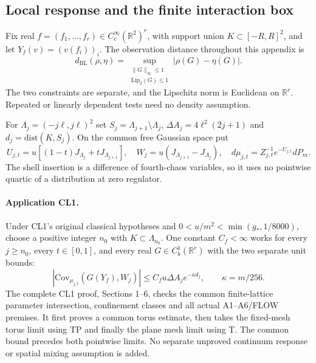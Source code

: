\documentclass[11pt]{article}
\theoremstyle{plain}
\theoremstyle{definition}
\theoremstyle{remark}
\newcommand{\R}{\mathbb{R}}
\newcommand{\dist}{\mathrm{dist}}
\begin{document}
\subsection{Local response and the finite interaction box}
\label{qrs:locality}

Fix real $f=(f_1,\ldots,f_r)\in C_c^\infty(\R^2)^r$, with support union
$K\subset[-R,R]^2$, and let $Y_f(v)=(v(f_i))_i$. The observation distance
throughout this appendix is
\begin{equation}\label{qrs:BL}
 d_{\mathrm{BL}}(\rho,\eta)
 =\sup_{\substack{\|G\|_\infty\le1\\ \mathrm{Lip}_{2}(G)\le1}}
     |\rho(G)-\eta(G)|.
\end{equation}
The two constraints are separate, and the Lipschitz norm is Euclidean on
$\R^r$. Repeated or linearly dependent tests need no density assumption.

For $\Lambda_j=(-j\ell,j\ell)^2$ set $S_j=\Lambda_{j+1}\setminus\Lambda_j$,
$\Delta A_j=4\ell^2(2j+1)$ and $d_j=\dist(K,S_j)$. On the common free
Gaussian space put
\begin{equation}\label{qrs:shell}
 U_{j,t}=u[(1-t)J_{\Lambda_j}+tJ_{\Lambda_{j+1}}],\quad
 W_j=u(J_{\Lambda_{j+1}}-J_{\Lambda_j}),\quad
 d\mu_{j,t}=Z_{j,t}^{-1}e^{-U_{j,t}}dP_m.
\end{equation}
The shell insertion is a difference of fourth-chaos variables, so it uses
no pointwise quartic of a distribution at zero regulator.

\paragraph{Application CL1.}
Under CL1's original classical hypotheses and
$0<u/m^2<\min(g_*,1/8000)$, choose a positive integer $n_0$ with
$K\subset\Lambda_{n_0}$. One constant $C_f<\infty$ works for every
$j\ge n_0$, every $t\in[0,1]$, and every real $G\in C_b^1(\R^r)$ with
the two separate unit bounds:
\begin{equation}\label{qrs:CL1}
 |\mathrm{Cov}_{\mu_{j,t}}(G(Y_f),W_j)|
 \le C_f u\Delta A_j e^{-\kappa d_j},\qquad \kappa=m/256.
\end{equation}
The complete CL1 proof, Sections 1--6, checks the common finite-lattice
parameter intersection, confinement classes and all actual A1--A6/FLOW
premises. It first proves a common torus estimate, then takes the
fixed-mesh torus limit using TP and finally the plane mesh limit using T.
The common bound precedes both pointwise limits. No separate unproved
continuum response or spatial mixing assumption is added.
\end{document}
